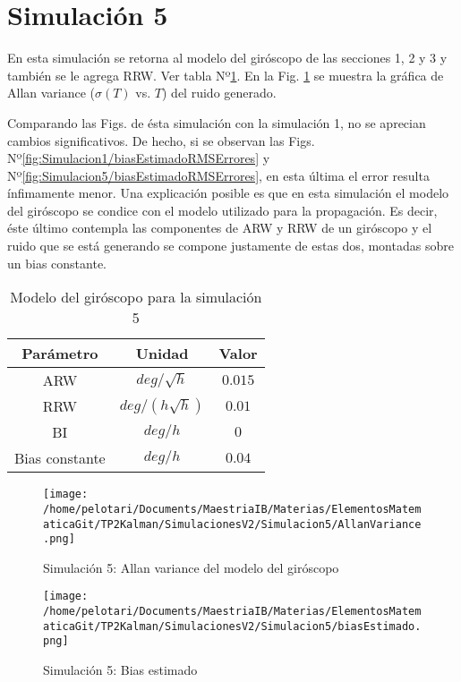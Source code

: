 \documentclass[a4paper,11pt,twoside]{IT-CNEA}
\begin{document}
\section{Simulación 5}
En esta simulación se retorna al modelo del giróscopo de las secciones 1, 2 y 3 y también se le agrega RRW. Ver tabla Nº\ref{tabla:modeloGyroRLGSimulacion5}. En la Fig. \ref{fig:Simulacion5/AllanVariance} se muestra la gráfica de Allan variance ($\sigma(T)$ vs. $T$) del ruido generado. 
\par Comparando las Figs. de ésta simulación con la simulación 1, no se aprecian cambios significativos. De hecho, si se observan las Figs. Nº\ref{fig:Simulacion1/biasEstimadoRMSErrores} y Nº\ref{fig:Simulacion5/biasEstimadoRMSErrores}, en esta última el error resulta ínfimamente menor. Una explicación posible es que en esta simulación el modelo del giróscopo se condice con el modelo utilizado para la propagación. Es decir, éste último contempla las componentes de ARW y RRW  de un giróscopo y el ruido que se está generando se compone justamente de estas dos, montadas sobre un bias constante.
\begin{table}[h!]
\centering
\caption{Modelo del giróscopo para la simulación 5}
\label{tabla:modeloGyroRLGSimulacion5}
\begin{tabular}{|c|c|c|}
\hline
Parámetro & Unidad& Valor\\ \hline
ARW&$deg/\sqrt{h}$&$0.015$ \\ \hline
RRW&$deg/\left(h\sqrt{h}\right)$&$0.01$ \\ \hline
BI&$deg/h$&$0$ \\ \hline
Bias constante&$deg/h$&$0.04$ \\ \hline
\end{tabular}
\end{table}
\begin{figure}[h!]
\centering
\texttt{[image: /home/pelotari/Documents/MaestriaIB/Materias/ElementosMatematicaGit/TP2Kalman/SimulacionesV2/Simulacion5/AllanVariance.png]}
\caption{Simulación 5:  Allan variance del modelo del giróscopo}
\label{fig:Simulacion5/AllanVariance}
\end{figure}
\begin{figure}[h!]
\centering
\texttt{[image: /home/pelotari/Documents/MaestriaIB/Materias/ElementosMatematicaGit/TP2Kalman/SimulacionesV2/Simulacion5/biasEstimado.png]}
\caption{Simulación 5:  Bias estimado}
\label{fig:Simulacion5/biasEstimado}
\end{figure}
\end{document}
